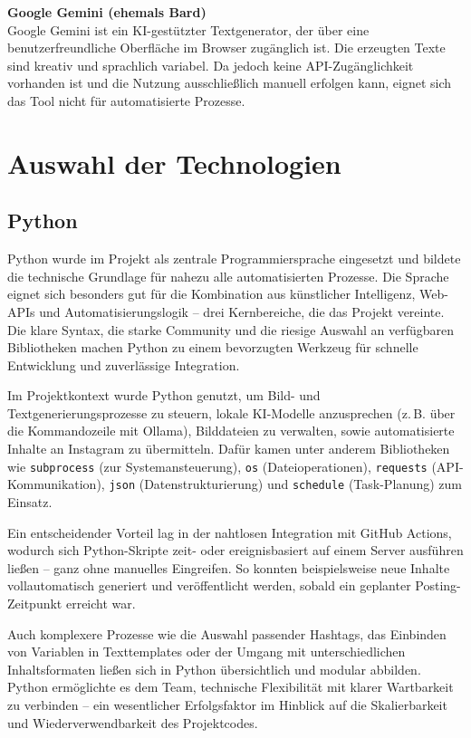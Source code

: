 \documentclass[a4paper,12pt]{article}
\begin{document}
\textbf{Google Gemini (ehemals Bard)} \\
Google Gemini ist ein KI-gestützter Textgenerator, der über eine benutzerfreundliche Oberfläche im Browser zugänglich ist. Die erzeugten Texte sind kreativ und sprachlich variabel. Da jedoch keine API-Zugänglichkeit vorhanden ist und die Nutzung ausschließlich manuell erfolgen kann, eignet sich das Tool nicht für automatisierte Prozesse.

\clearpage

\section{Auswahl der Technologien}
\subsection{Python}

Python wurde im Projekt als zentrale Programmiersprache eingesetzt und bildete die technische Grundlage für nahezu alle automatisierten Prozesse. Die Sprache eignet sich besonders gut für die Kombination aus künstlicher Intelligenz, Web-APIs und Automatisierungslogik – drei Kernbereiche, die das Projekt vereinte. Die klare Syntax, die starke Community und die riesige Auswahl an verfügbaren Bibliotheken machen Python zu einem bevorzugten Werkzeug für schnelle Entwicklung und zuverlässige Integration.

Im Projektkontext wurde Python genutzt, um Bild- und Textgenerierungsprozesse zu steuern, lokale KI-Modelle anzusprechen (z.\,B. über die Kommandozeile mit Ollama), Bilddateien zu verwalten, sowie automatisierte Inhalte an Instagram zu übermitteln. Dafür kamen unter anderem Bibliotheken wie \texttt{subprocess} (zur Systemansteuerung), \texttt{os} (Dateioperationen), \texttt{requests} (API-Kommunikation), \texttt{json} (Datenstrukturierung) und \texttt{schedule} (Task-Planung) zum Einsatz.

Ein entscheidender Vorteil lag in der nahtlosen Integration mit GitHub Actions, wodurch sich Python-Skripte zeit- oder ereignisbasiert auf einem Server ausführen ließen – ganz ohne manuelles Eingreifen. So konnten beispielsweise neue Inhalte vollautomatisch generiert und veröffentlicht werden, sobald ein geplanter Posting-Zeitpunkt erreicht war.

Auch komplexere Prozesse wie die Auswahl passender Hashtags, das Einbinden von Variablen in Texttemplates oder der Umgang mit unterschiedlichen Inhaltsformaten ließen sich in Python übersichtlich und modular abbilden. Python ermöglichte es dem Team, technische Flexibilität mit klarer Wartbarkeit zu verbinden – ein wesentlicher Erfolgsfaktor im Hinblick auf die Skalierbarkeit und Wiederverwendbarkeit des Projektcodes.
\end{document}
